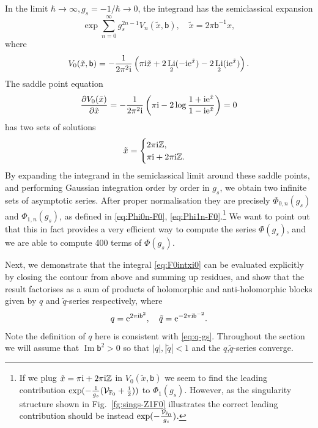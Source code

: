 \documentclass[a4paper,11pt]{article}
\theoremstyle{definition}
\newcommand{\CV}{{\cal V}}
\def\IZ{{\mathbb Z}}
\def\IF{{\mathbb F}}
\newcommand{\re}{{\rm e}}
\newcommand{\ri}{{\rm i}}
\def\tq{{\tilde{q}}}
\def\tx{{\tilde{x}}}
\newcommand{\bb}{\mathsf{b}}
\newcommand{\pd}{\partial}
\DeclareMathOperator{\Li}{Li}
\DeclareMathOperator{\imag}{Im}
\begin{document}
In the limit $\hbar \rightarrow\infty, g_s = -1/\hbar \rightarrow 0$,
the integrand has the semiclassical expansion
%
\begin{equation}
  \exp \sum_{n=0}^\infty g_s^{2n-1} V_n(\tx,\bb),
  \quad \tx = 2\pi\bb^{-1}x,
\end{equation}
%
where
%
\begin{equation}
  V_0(\tx,\bb) = -\frac{1}{2\pi^2\ri}\left(\pi\ri\tx + 2\Li_2(-\ri
    \re^{\tx}) - 2\Li_2(\ri \re^{\tx})\right).
\end{equation}
%
The saddle point equation
\begin{equation}
  \frac{\pd V_0(\tx)}{\pd \tx} = -\frac{1}{2\pi^2\ri}
  \left(\pi\ri-2\log\frac{1+\ri \re^{\tx}}{1-\ri \re^{\tx}}\right) = 0
\end{equation}
%
has two sets of solutions
%
\begin{equation}
  \tx =
  \begin{cases}
    2\pi\ri \IZ,\\
    \pi\ri+2\pi\ri \IZ.
  \end{cases}
\end{equation}
%
By expanding the integrand in the semiclassical limit around these saddle
points, and performing Gaussian integration order by order in $g_s$, we obtain two
infinite sets of asymptotic series.  After proper normalisation they
are precisely $\Phi_{0,n}(g_s)$ and $\Phi_{1,n}(g_s)$, as defined in
\eqref{eq:Phi0n-F0}, \eqref{eq:Phi1n-F0}.\footnote{If we plug
  $\tx = \pi\ri +2\pi\ri\IZ$ in $V_0(\tx,\bb)$ we seem to find the
  leading contribution
  $\exp(-\frac{1}{g_s}(\CV_{\IF_0}+\frac{\ri}{2}))$ to
  $\Phi_{1}(g_s)$.  However, as the singularity structure shown in
  Fig.~\ref{fg:sings-Z1F0} illustrates the correct leading
  contribution should be instead $\exp(-\frac{\CV_{\IF_0}}{g_s})$.}
We want to point out that this in fact provides a very efficient way
to compute the series $\Phi(g_s)$, and we are able to compute 400 terms
of $\Phi(g_s)$.

Next, we demonstrate that the integral \eqref{eq:F0intxi0} can be
evaluated explicitly by closing the contour from above and summing up
residues, and show that the result factorises as a sum of products of
holomorphic and anti-holomorphic blocks given by $q$ and $\tq$-series
respectively, where
%
\begin{equation}
  q = \re^{2\pi\ri\bb^2},\quad \tq = \re^{-2\pi\ri \bb^{-2}}.
\end{equation}
%
Note the definition of $q$ here is consistent with \eqref{eq:q-gs}.
Throughout the section we will assume that $\imag\bb^2 > 0$ so that
$|q| , |\tq|<1$ and the $q$,$\tq$-series converge.
\end{document}
